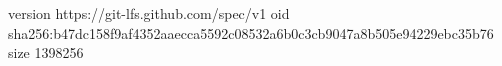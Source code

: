 version https://git-lfs.github.com/spec/v1
oid sha256:b47dc158f9af4352aaecca5592c08532a6b0c3cb9047a8b505e94229ebc35b76
size 1398256

